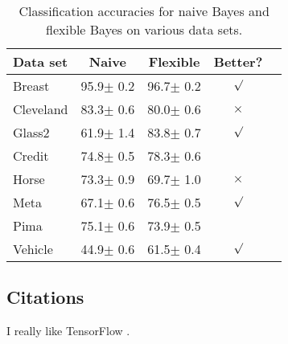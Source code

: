 \documentclass{article}
\begin{document}
\begin{table}[t]
\caption{Classification accuracies for naive Bayes and flexible
Bayes on various data sets.}
\label{sample-table}
\begin{center}
\begin{small}
\begin{sc}
\begin{tabular}{lcccr}
\toprule
Data set & Naive & Flexible & Better? \\
\midrule
Breast    & 95.9$\pm$ 0.2& 96.7$\pm$ 0.2& $\surd$ \\
Cleveland & 83.3$\pm$ 0.6& 80.0$\pm$ 0.6& $\times$\\
Glass2    & 61.9$\pm$ 1.4& 83.8$\pm$ 0.7& $\surd$ \\
Credit    & 74.8$\pm$ 0.5& 78.3$\pm$ 0.6&         \\
Horse     & 73.3$\pm$ 0.9& 69.7$\pm$ 1.0& $\times$\\
Meta      & 67.1$\pm$ 0.6& 76.5$\pm$ 0.5& $\surd$ \\
Pima      & 75.1$\pm$ 0.6& 73.9$\pm$ 0.5&         \\
Vehicle   & 44.9$\pm$ 0.6& 61.5$\pm$ 0.4& $\surd$ \\
\bottomrule
\end{tabular}
\end{sc}
\end{small}
\end{center}
\vskip -0.1in
\end{table}

\subsection{Citations}

I really like TensorFlow \cite{tensorflow2015-whitepaper}.



\end{document}
